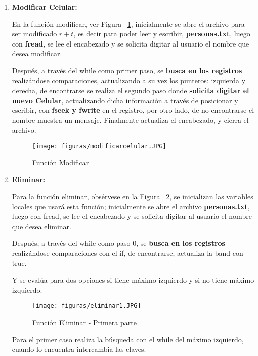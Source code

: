 \documentclass[10pt,conference]{IEEEtran}
\begin{document}
\begin{enumerate}[]
    \item {\textbf{Modificar Celular:}}
        \par En la función modificar, ver Figura ~\ref{fmodificar}, inicialmente se abre el archivo para ser modificado $r + t$, es decir para poder leer y escribir, \textbf{personas.txt}, luego con \textbf{fread}, se lee el encabezado y se solicita digitar al usuario el nombre que desea modificar.
        
        Después, a través del while como primer paso, se \textbf{busca en los registros} realizándose comparaciones, actualizando a su vez los punteros: izquierda y derecha, de encontrarse se realiza el segundo paso donde \textbf{solicita digitar el nuevo Celular}, actualizando dicha información a través de posicionar y escribir, con \textbf{fseek y fwrite} en el registro, por otro lado, de no encontrarse el nombre muestra un mensaje. Finalmente actualiza el encabezado, y cierra el archivo.
        \begin{figure}[H]
            \begin{center}
            \texttt{[image: figuras/modificarcelular.JPG]}
            \caption{Función Modificar}
             \label{fmodificar} 
             \end{center}
        \end{figure}
        
        
    \item {\textbf{Eliminar:}}
        
        \par Para la función eliminar, obsérvese en la Figura ~\ref{feliminar1}, se inicializan las variables locales que usará esta función; inicialmente se abre el archivo \textbf{personas.txt}, luego con fread, se lee el encabezado y se solicita digitar al usuario el nombre que desea eliminar.
        
        Después, a través del while como paso $0$, se \textbf{busca en los registros} realizándose comparaciones con el if, de encontrarse, actualiza la band con true.
        
        Y se evalúa para dos opciones si tiene máximo izquierdo y si no tiene máximo izquierdo.
        
        \begin{figure}[H]
            \begin{center}
            \texttt{[image: figuras/eliminar1.JPG]}
            \caption{Función Eliminar - Primera parte}
             \label{feliminar1} 
             \end{center}
        \end{figure}
        Para el primer caso realiza la búsqueda con el while del máximo izquierdo, cuando lo encuentra intercambia las claves.
        

\end{enumerate}
\end{document}
